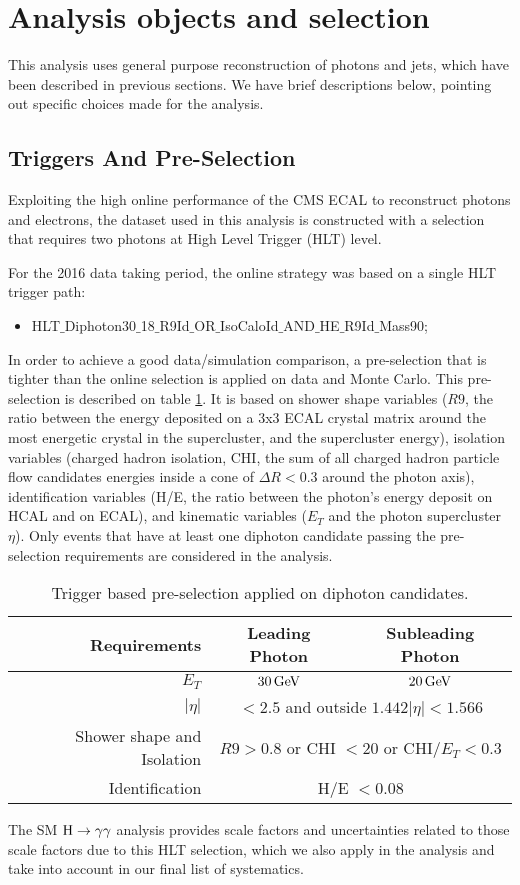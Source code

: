 \section{Analysis objects and selection}
This analysis uses general purpose reconstruction of photons and jets, which have been described in previous sections. 
We have brief descriptions below, pointing out specific choices made for the analysis.

\subsection{Triggers And Pre-Selection}
\label{sec:trigger}
Exploiting the high online performance of the CMS ECAL to reconstruct photons and electrons, the dataset used in this analysis is constructed with a selection that requires two photons at High Level Trigger (HLT) level.

For the 2016 data taking period, the online strategy was based on a single HLT trigger path:
\begin{itemize}
\item HLT$\_$Diphoton30$\_$18$\_$R9Id$\_$OR$\_$IsoCaloId$\_$AND$\_$HE$\_$R9Id$\_$Mass90;
\end{itemize}

In order to achieve a good data/simulation comparison, a pre-selection that is tighter than the online selection is applied on data and Monte Carlo. This pre-selection is described on table \ref{tab:preselection}. It is based on shower shape variables ($R9$, the ratio between the energy deposited on a 3x3 ECAL crystal matrix around the most energetic crystal in the supercluster, and the supercluster energy), isolation variables (charged hadron isolation, CHI, the sum of all charged hadron particle flow candidates energies inside a cone of $\Delta R < 0.3$ around the photon axis), identification variables (H/E, the ratio between the photon's energy deposit on HCAL and on ECAL), and kinematic variables ($E_{T}$ and the photon supercluster $\eta$). Only events that have at least one diphoton candidate passing the pre-selection requirements are considered in the analysis.

 \begin{table}[h]
\centering
\small{
\begin{tabular}{rcc}
Requirements & Leading Photon & Subleading Photon \\ \hline
$E_{T}$ & $30 \,\text{Ge\hspace{-.08em}V}$ & $20 \,\text{Ge\hspace{-.08em}V}$ \\ \hline
$|\eta|$ & \multicolumn{2}{c}{ $< 2.5$ and outside $1.442  |\eta| < 1.566$ } \\ \hline
Shower shape and Isolation & \multicolumn{2}{c}{ $R9 > 0.8$ or CHI $< 20$ or CHI/$E_{T} < 0.3$} \\ \hline
Identification & \multicolumn{2}{c}{ H/E $< 0.08$} \\ \hline
\end{tabular}
}
\caption{\small Trigger based pre-selection applied on diphoton candidates.  \label{tab:preselection}}
\end{table}

The SM $\mathrm{H}\to\gamma\gamma$ analysis provides scale factors and uncertainties related to those scale factors due to this HLT selection, which we also apply in the analysis and take into account in our final list of systematics. 
